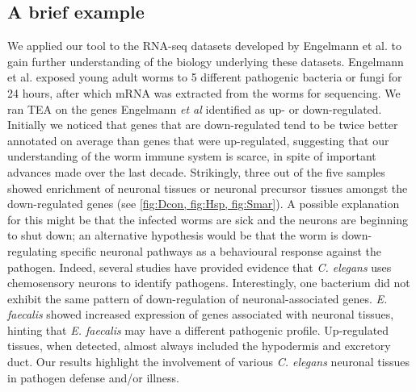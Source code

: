 \documentclass[linenumbers, doublespacing]{bmcart}
\begin{document}
\subsection*{A brief example}
We applied our tool to the RNA-seq datasets developed by Engelmann et al.  \cite{Engelmann2011} to gain further understanding of the biology underlying these datasets. Engelmann et al.  exposed young adult worms to 5 different pathogenic bacteria or fungi for 24 hours, after which mRNA was extracted from the worms for sequencing. We ran TEA on the genes Engelmann \emph{et al} identified as up- or down-regulated. Initially we noticed that genes that are down-regulated tend to be twice better annotated on average than genes that were up-regulated, suggesting that our understanding of the worm immune system is scarce, in spite of important advances made over the last decade. Strikingly, three out of the five samples showed enrichment of neuronal tissues or neuronal precursor tissues amongst the down-regulated genes (see \ref{fig:Dcon, fig:Hsp, fig:Smar}). A possible explanation for this might be that the infected worms are sick and the neurons are beginning to shut down; an alternative hypothesis would be that the worm is down-regulating specific neuronal pathways as a behavioural response against the pathogen. Indeed, several studies \cite{Meisel2014, Zhang2005} have provided evidence that \emph{C. elegans} uses chemosensory neurons to identify pathogens. Interestingly, one bacterium did not exhibit the same pattern of down-regulation of neuronal-associated genes. \emph{E. faecalis} showed increased expression of genes associated with neuronal tissues, hinting that \emph{E. faecalis} may have a different pathogenic profile. Up-regulated tissues, when detected, almost always included the hypodermis and excretory duct.
	Our results highlight the involvement of various \emph{C. elegans} neuronal tissues in pathogen defense and/or illness.
\end{document}
